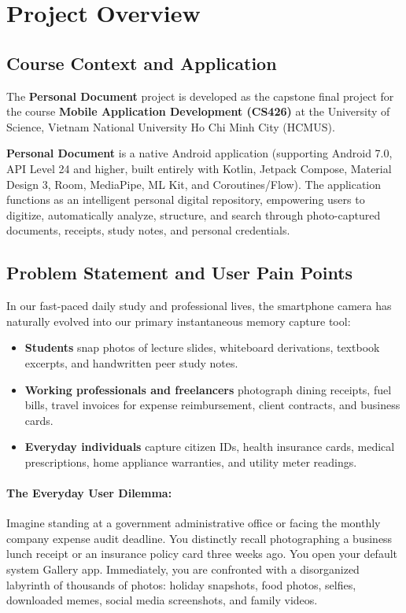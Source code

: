 \section{Project Overview}

\subsection{Course Context and Application}
The \textbf{Personal Document} project is developed as the capstone final project for the course \textbf{Mobile Application Development (CS426)} at the University of Science, Vietnam National University Ho Chi Minh City (HCMUS).

\textbf{Personal Document} is a native Android application (supporting Android 7.0, API Level 24 and higher, built entirely with Kotlin, Jetpack Compose, Material Design 3, Room, MediaPipe, ML Kit, and Coroutines/Flow). The application functions as an intelligent personal digital repository, empowering users to digitize, automatically analyze, structure, and search through photo-captured documents, receipts, study notes, and personal credentials.

\subsection{Problem Statement and User Pain Points}
In our fast-paced daily study and professional lives, the smartphone camera has naturally evolved into our primary instantaneous memory capture tool:
\begin{itemize}
    \item \textbf{Students} snap photos of lecture slides, whiteboard derivations, textbook excerpts, and handwritten peer study notes.
    \item \textbf{Working professionals and freelancers} photograph dining receipts, fuel bills, travel invoices for expense reimbursement, client contracts, and business cards.
    \item \textbf{Everyday individuals} capture citizen IDs, health insurance cards, medical prescriptions, home appliance warranties, and utility meter readings.
\end{itemize}

\paragraph{The Everyday User Dilemma:}
Imagine standing at a government administrative office or facing the monthly company expense audit deadline. You distinctly recall photographing a business lunch receipt or an insurance policy card three weeks ago. You open your default system Gallery app. Immediately, you are confronted with a disorganized labyrinth of thousands of photos: holiday snapshots, food photos, selfies, downloaded memes, social media screenshots, and family videos.

